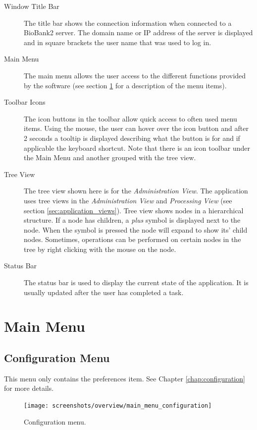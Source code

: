 \begin{description}
\item[Window Title Bar] The title bar shows the connection information when
  connected to a BioBank2 server. The domain name or IP address of the server
  is displayed and in square brackets the user name that was used to log in.
\item[Main Menu] The main menu allows the user access to the different
  functions provided by the software (see section \ref{sec:main_menu} for a
  description of the menu items).
\item[Toolbar Icons] The icon buttons in the toolbar allow quick access to
  often used menu items. Using the mouse, the user can hover over the icon
  button and after 2 seconds a tooltip is displayed describing what the
  button is for and if applicable the keyboard shortcut. Note that there is
  an icon toolbar under the Main Menu and another grouped with the tree view.
\item[Tree View] The tree view shown here is for the \emph{Administration
  View}. The application uses tree views in the \emph{Administration View}
  and \emph{Processing View} (see section \ref{sec:application_views}). Tree
  view shows nodes in a hierarchical structure. If a node has children, a
  \emph{plus} symbol is displayed next to the node. When the symbol is
  pressed the node will expand to show its' child nodes.  Sometimes,
  operations can be performed on certain nodes in the tree by right clicking
  with the mouse on the node.
\item[Status Bar] The status bar is used to display the current state of the
  application. It is usually updated after the user has completed a task.
\end{description}

\section{Main Menu}
\label{sec:main_menu}

\subsection{}
\subsection{Configuration Menu}
This menu only contains the preferences item. See Chapter
\ref{chap:configuration} for more details.
\begin{figure}[H]
  \centering
  \scalebox{0.5}
	   { \texttt{[image: screenshots/overview/main\_menu\_configuration]} }
	   \caption{Configuration menu.}
	   \label{fig:main_menu_configuration}
\end{figure}
